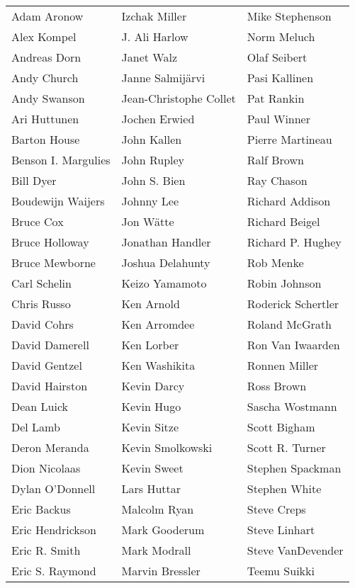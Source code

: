 \documentclass[a4paper, 10pt]{article}
\begin{document}
\begin{center}
\begin{tabular}{lll}
Adam Aronow & Izchak Miller & Mike Stephenson\\
Alex Kompel & J. Ali Harlow & Norm Meluch\\
Andreas Dorn & Janet Walz & Olaf Seibert\\
Andy Church & Janne Salmij\"{a}rvi & Pasi Kallinen\\
Andy Swanson & Jean-Christophe Collet & Pat Rankin\\
Ari Huttunen & Jochen Erwied & Paul Winner\\
Barton House & John Kallen & Pierre Martineau\\
Benson I. Margulies & John Rupley & Ralf Brown\\
Bill Dyer & John S. Bien & Ray Chason\\
Boudewijn Waijers & Johnny Lee & Richard Addison\\
Bruce Cox & Jon Wätte & Richard Beigel\\
Bruce Holloway & Jonathan Handler & Richard P. Hughey\\
Bruce Mewborne & Joshua Delahunty & Rob Menke\\
Carl Schelin & Keizo Yamamoto & Robin Johnson\\
Chris Russo & Ken Arnold & Roderick Schertler\\
David Cohrs & Ken Arromdee & Roland McGrath\\
David Damerell & Ken Lorber & Ron Van Iwaarden\\
David Gentzel & Ken Washikita & Ronnen Miller\\
David Hairston & Kevin Darcy & Ross Brown\\
Dean Luick & Kevin Hugo & Sascha Wostmann\\
Del Lamb & Kevin Sitze & Scott Bigham\\
Deron Meranda & Kevin Smolkowski & Scott R. Turner\\
Dion Nicolaas & Kevin Sweet & Stephen Spackman\\
Dylan O'Donnell & Lars Huttar & Stephen White\\
Eric Backus & Malcolm Ryan & Steve Creps\\
Eric Hendrickson & Mark Gooderum & Steve Linhart\\
Eric R. Smith & Mark Modrall & Steve VanDevender\\
Eric S. Raymond & Marvin Bressler & Teemu Suikki\\

\end{tabular}
\end{center}
\end{document}
